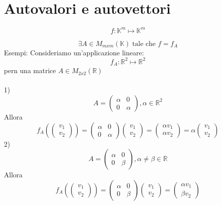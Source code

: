 \documentclass[12pt]{article}
\begin{document}
\pagebreak

\section{Autovalori e autovettori}

\[f: \mathbb{K}^m \mapsto \mathbb{K}^m\]

\[\exists A \in M_{mxm}(\mathbb{K}) \; \text{tale che $f = f_A$}\]
Esempi: Consideriamo un'applicazione lineare:
\[f_A: \mathbb{R}^2 \mapsto \mathbb{R}^2\]
pern una matrice $A \in M_{2x2} (\mathbb{R})$\\\\
1)
\[A = \begin{pmatrix}
    \alpha & 0\\
    0 & \alpha
\end{pmatrix}, \alpha \in \mathbb{R}^2\]
Allora \[f_A\left(\begin{pmatrix}
    v_1\\
    v_2
\end{pmatrix}\right) = \begin{pmatrix}
    \alpha & 0\\
    0 & \alpha
\end{pmatrix} \begin{pmatrix}
    v_1\\
    v_2
\end{pmatrix} = \begin{pmatrix}
    \alpha v_1\\
    \alpha v_2
\end{pmatrix} = \alpha\begin{pmatrix}
    v_1\\
    v_2
\end{pmatrix}\]
2)
\[A = \begin{pmatrix}
    \alpha & 0\\
    0 & \beta
\end{pmatrix},  \alpha \neq \beta \in \mathbb{R}\]
Allora
\[f_A\left(\begin{pmatrix}
    v_1\\
    v_2
\end{pmatrix}\right) = \begin{pmatrix}
    \alpha & 0\\
    0 & \beta
\end{pmatrix} \begin{pmatrix}
    v_1\\
    v_2
\end{pmatrix} = \begin{pmatrix}
    \alpha v_1\\
    \beta v_2
\end{pmatrix}\]
\end{document}
